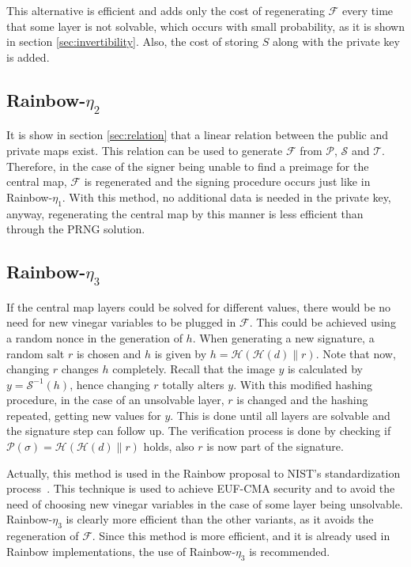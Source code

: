\documentclass{ufsctex/ufsctex}
\begin{document}
This alternative is efficient and adds only the cost of regenerating
$\mathcal{F}$ every time that some layer is not solvable, which occurs with
small probability, as it is shown in section \ref{sec:invertibility}. Also, the
cost of storing $S$ along with the private key is added.

\subsection{Rainbow-$\eta_2$}

It is show in section \ref{sec:relation} that a linear relation between the
public and private maps exist. This relation can be used to generate
$\mathcal{F}$ from $\mathcal{P}$, $\mathcal{S}$ and $\mathcal{T}$. Therefore,
in the case of the signer being unable to find a preimage for the central map,
$\mathcal{F}$ is regenerated and the signing procedure occurs just like in
Rainbow-$\eta_1$. With this method, no additional data is needed in the private
key, anyway, regenerating the central map by this manner is less efficient than
through the PRNG solution.

\subsection{Rainbow-$\eta_3$}\label{sec:rainboweta3}

If the central map layers could be solved for different values, there would be
no need for new vinegar variables to be plugged in $\mathcal{F}$. This could be
achieved using a random nonce in the generation of $h$. When generating a new
signature, a random salt $r$ is chosen and $h$ is given by $h =
\mathcal{H}(\mathcal{H}(d) \| r)$. Note that now, changing $r$ changes $h$
completely.  Recall that the image $y$ is calculated by $y =
\mathcal{S}^{-1}(h)$, hence changing $r$ totally alters $y$. With this modified
hashing procedure, in the case of an unsolvable layer, $r$ is changed and the
hashing repeated, getting new values for $y$. This is done until all layers are
solvable and the signature step can follow up. The verification process is done
by checking if $\mathcal{P}(\sigma) = \mathcal{H}(\mathcal{H}(d) \| r)$ holds,
also $r$ is now part of the signature.

Actually, this method is used in the Rainbow proposal to NIST's standardization
process~\cite{ding2017nist}. This technique is used to achieve
EUF-CMA
security and to avoid the need of choosing new vinegar variables in the case of
some layer being unsolvable. Rainbow-$\eta_3$ is clearly more efficient than
the other variants, as it avoids the regeneration of $\mathcal{F}$. Since this
method is more efficient, and it is already used in Rainbow implementations,
the use of Rainbow-$\eta_3$ is recommended.
\end{document}
